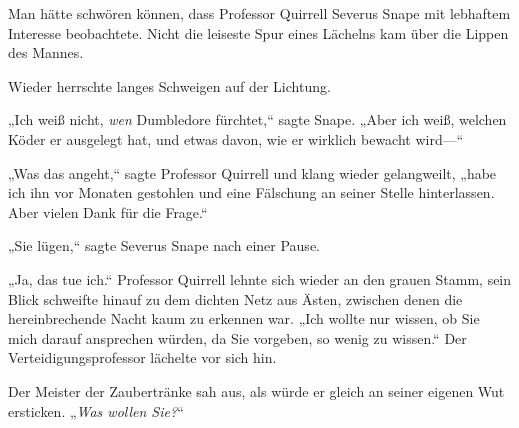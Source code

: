 Man hätte schwören können, dass Professor Quirrell Severus Snape mit lebhaftem Interesse beobachtete. Nicht die leiseste Spur eines Lächelns kam über die Lippen des Mannes.

Wieder herrschte langes Schweigen auf der Lichtung.

„Ich weiß nicht, \emph{wen} Dumbledore fürchtet,“ sagte Snape. „Aber ich weiß, welchen Köder er ausgelegt hat, und etwas davon, wie er wirklich bewacht wird—“

„Was das angeht,“ sagte Professor Quirrell und klang wieder gelangweilt, „habe ich ihn vor Monaten gestohlen und eine Fälschung an seiner Stelle hinterlassen. Aber vielen Dank für die Frage.“

„Sie lügen,“ sagte Severus Snape nach einer Pause.

„Ja, das tue ich.“ Professor Quirrell lehnte sich wieder an den grauen Stamm, sein Blick schweifte hinauf zu dem dichten Netz aus Ästen, zwischen denen die hereinbrechende Nacht kaum zu erkennen war. „Ich wollte nur wissen, ob Sie mich darauf ansprechen würden, da Sie vorgeben, so wenig zu wissen.“ Der Verteidigungsprofessor lächelte vor sich hin.

Der Meister der Zaubertränke sah aus, als würde er gleich an seiner eigenen Wut ersticken. „\emph{Was wollen Sie?}“


